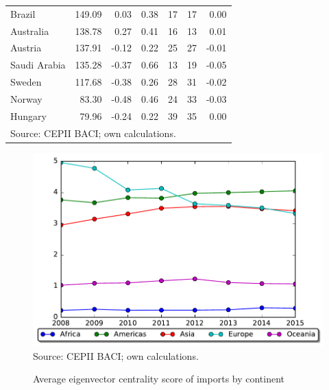 \documentclass[10pt,letterpaper]{article}
\begin{document}
\begin{table}[h]
{\begin{tabular}{lrrrccr}
Brazil             & 149.09  & 0.03  & 0.38 & 17 & 17 & 0.00  \\
Australia          & 138.78  & 0.27  & 0.41 & 16 & 13 & 0.01  \\
Austria            & 137.91  & -0.12 & 0.22 & 25 & 27 & -0.01 \\
Saudi Arabia       & 135.28  & -0.37 & 0.66 & 13 & 19 & -0.05 \\
Sweden             & 117.68  & -0.38 & 0.26 & 28 & 31 & -0.02 \\
Norway             & 83.30    & -0.48 & 0.46 & 24 & 33 & -0.03 \\
Hungary            & 79.96   & -0.24 & 0.22 & 39 & 35 & 0.00 \\
\bottomrule 
\multicolumn{7}{l}{\footnotesize{Source: CEPII BACI; own calculations.}}\\
\end{tabular}}
\end{table}



\begin{figure}
  \caption{Average eigenvector centrality score of imports by continent}
  \centering
\includegraphics[scale=0.7]{plots/cent_continent.pdf} \\
\footnotesize{Source: CEPII BACI; own calculations.}\\
\end{figure}
\end{document}
